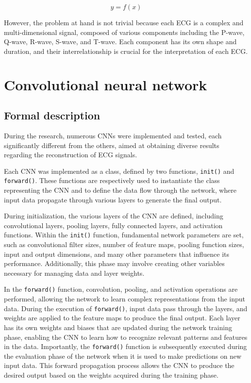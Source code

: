 \documentclass[12pt,italian]{report}
\begin{document}
\begin{equation}
    y = f(x)
    \label{eq:modello}
\end{equation}

However, the problem at hand is not trivial because each ECG is a complex and multi-dimensional signal, composed of various components including the P-wave, Q-wave, R-wave, S-wave, and T-wave. Each component has its own shape and duration, and their interrelationship is crucial for the interpretation of each ECG.

\section{Convolutional neural network}
\label{sec:network}

\subsection{Formal description}
\label{subsec:descrizione}

During the research, numerous CNNs were implemented and tested, each significantly different from the others, aimed at obtaining diverse results regarding the reconstruction of ECG signals.

Each CNN was implemented as a class, defined by two functions, \texttt{init()} and \texttt{forward()}. These functions are respectively used to instantiate the class representing the CNN and to define the data flow through the network, where input data propagate through various layers to generate the final output.

During initialization, the various layers of the CNN are defined, including convolutional layers, pooling layers, fully connected layers, and activation functions. Within the \texttt{init()} function, fundamental network parameters are set, such as convolutional filter sizes, number of feature maps, pooling function sizes, input and output dimensions, and many other parameters that influence its performance. Additionally, this phase may involve creating other variables necessary for managing data and layer weights.

In the \texttt{forward()} function, convolution, pooling, and activation operations are performed, allowing the network to learn complex representations from the input data. During the execution of \texttt{forward()}, input data pass through the layers, and weights are applied to the feature maps to produce the final output. Each layer has its own weights and biases that are updated during the network training phase, enabling the CNN to learn how to recognize relevant patterns and features in the data. Importantly, the \texttt{forward()} function is subsequently executed during the evaluation phase of the network when it is used to make predictions on new input data. This forward propagation process allows the CNN to produce the desired output based on the weights acquired during the training phase.
\end{document}

